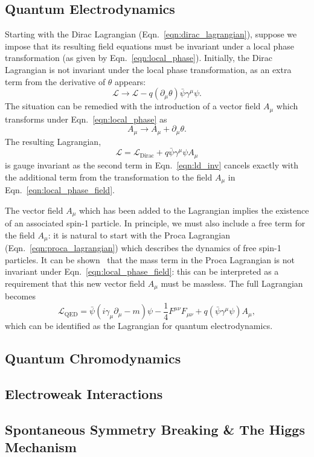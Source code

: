 \subsection{Quantum Electrodynamics} \label{sec:theory_qed}
Starting with the Dirac Lagrangian (Eqn.~\ref{eqn:dirac_lagrangian}), suppose we impose that its resulting field equations must be invariant under a local phase transformation (as given by Eqn.~\ref{eqn:local_phase}).
Initially, the Dirac Lagrangian is not invariant under the local phase transformation, as an extra term from the derivative of $\theta$ appears:
\begin{equation} \label{eqn:ld_var}
    \mathcal L \to \mathcal L - q (\partial_\mu \theta)\bar{\psi} \gamma^\mu \psi.
\end{equation}
The situation can be remedied with the introduction of a vector field $A_\mu$ which transforms under Eqn.~\ref{eqn:local_phase} as
\begin{equation} \label{eqn:local_phase_field}
    A_\mu \to A_\mu + \partial_\mu \theta.
\end{equation}
The resulting Lagrangian,
\begin{equation} \label{eqn:ld_inv}
    \mathcal L = \mathcal L_{\text{Dirac}} + q \bar{\psi} \gamma^\mu \psi A_\mu
\end{equation}
is gauge invariant as the second term in Eqn.~\ref{eqn:ld_inv} cancels exactly with the additional term from the transformation to the field $A_\mu$ in Eqn.~\ref{eqn:local_phase_field}.

The vector field $A_\mu$ which has been added to the Lagrangian implies the existence of an associated spin-1 particle.
In principle, we must also include a free term for the field $A_\mu$: it is natural to start with the Proca Lagrangian (Eqn.~\ref{eqn:proca_lagrangian}) which describes the dynamics of free spin-1 particles.
It can be shown~\cite{Griffiths:2008zz} that the mass term in the Proca Lagrangian is not invariant under Eqn.~\ref{eqn:local_phase_field}: this can be interpreted as a requirement that this new vector field $A_\mu$ must be massless.
The full Lagrangian becomes
\begin{equation}
    \mathcal L_{\text{QED}} = \bar{\psi}(i \gamma_\mu \partial_\mu - m) \psi - \frac{1}{4} F^{\mu\nu}F_{\mu\nu} + q (\bar{\psi}\gamma^\mu \psi)A_\mu,
\end{equation}
which can be identified as the Lagrangian for quantum electrodynamics.

\subsection{Quantum Chromodynamics} \label{sec:theory_qcd}

\subsection{Electroweak Interactions} \label{sec:theory_ewk}

\subsection{Spontaneous Symmetry Breaking \& The Higgs Mechanism} \label{sec:theory_ssbhm} 
